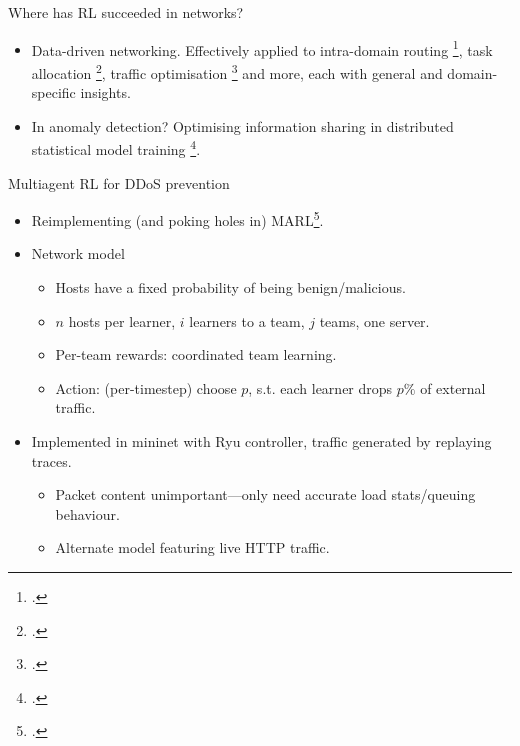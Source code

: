 \documentclass[aspectratio=169,xcolor={dvipsnames}
,hide notes
]{beamer}
\begin{document}
\begin{frame}{Where has RL succeeded in networks?}
	
	\begin{itemize}
		\item \alert{Data-driven networking.} Effectively applied to intra-domain routing \footcite{DBLP:conf/hotnets/ValadarskySST17}, task allocation \footcite{DBLP:conf/hotnets/MaoAMK16}, traffic optimisation \footcite{DBLP:conf/sigcomm/ChenL0L18} and more, each with general and domain-specific insights.
		
		\item \alert{In anomaly detection?} Optimising information sharing in distributed statistical model training \footcite{DBLP:conf/paisi/XuSH07}.
	\end{itemize}
\end{frame}



\begin{frame}{Multiagent RL for DDoS prevention}
%	
%	
%
	
	\begin{itemize}
		\item Reimplementing (and poking holes in) MARL\footcite{DBLP:journals/eaai/MalialisK15}.
		
		\item Network model
		\begin{itemize}
			\item Hosts have a fixed probability of being benign/malicious.
			\item $n$ hosts per learner, $i$ learners to a team, $j$ teams, one server.
			\item Per-team rewards: \alert{coordinated team learning}.
			\item Action: (per-timestep) choose $p$, s.t. each learner drops $p\%$ of external traffic.
		\end{itemize}
	
		\item Implemented in mininet with Ryu controller, traffic generated by replaying traces.
		\begin{itemize}
			\item Packet content unimportant---only need accurate load stats/queuing behaviour.
			\item Alternate model featuring live HTTP traffic.
		\end{itemize}
	\end{itemize}
\end{frame}
\end{document}
